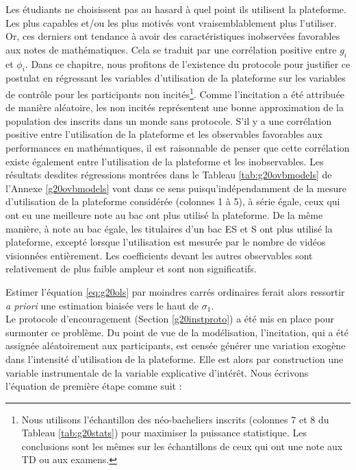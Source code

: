 \documentclass[
]{book}
\begin{document}
\quad Les étudiants ne choisissent pas au hasard à quel point ils utilisent la plateforme. Les plus capables et/ou les plus motivés vont vraisemblablement plus l'utiliser. Or, ces derniers ont tendance à avoir des caractéristiques inobservées favorables aux notes de mathématiques.
Cela se traduit par une corrélation positive entre \(g_i\) et \(\phi_i\). Dans ce chapitre, nous profitons de l'existence du protocole pour justifier ce postulat en régressant les variables d'utilisation de la plateforme sur les variables de contrôle pour les participants non incités\footnote{Nous utilisons l'échantillon des néo-bacheliers inscrits (colonnes 7 et 8 du Tableau \ref{tab:g20stats}) pour maximiser la puissance statistique. Les conclusions sont les mêmes sur les échantillons de ceux qui ont une note aux TD ou aux examens.}. Comme l'incitation a été attribuée de manière aléatoire, les non incités représentent une bonne approximation de la population des inscrits dans un monde sans protocole. S'il y a une corrélation positive entre l'utilisation de la plateforme et les observables favorables aux performances en mathématiques, il est raisonnable de penser que cette corrélation existe également entre l'utilisation de la plateforme et les inobservables. Les résultats desdites régressions montrées dans le Tableau \ref{tab:g20ovbmodels} de l'Annexe \ref{g20ovbmodels} vont dans ce sens puisqu'indépendamment de la mesure d'utilisation de la plateforme considérée (colonnes 1 à 5), à série égale, ceux qui ont eu une meilleure note au bac ont plus utilisé la plateforme. De la même manière, à note au bac égale, les titulaires d'un bac ES et S ont plus utilisé la plateforme, excepté lorsque l'utilisation est mesurée par le nombre de vidéos visionnées entièrement. Les coefficients devant les autres observables sont relativement de plus faible ampleur et sont non significatifs.

Estimer l'équation \eqref{eq:g20ols} par moindres carrés ordinaires ferait alors ressortir \emph{a priori} une estimation biaisée vers le haut de \(\sigma_1\).\\
Le protocole d'encouragement (Section \ref{g20instproto}) a été mis en place pour surmonter ce problème. Du point de vue de la modélisation, l'incitation, qui a été assignée aléatoirement aux participants, est censée générer une variation exogène dans l'intensité d'utilisation de la plateforme. Elle est alors par construction une variable instrumentale de la variable explicative d'intérêt. Nous écrivons l'équation de première étape comme suit :
\end{document}
